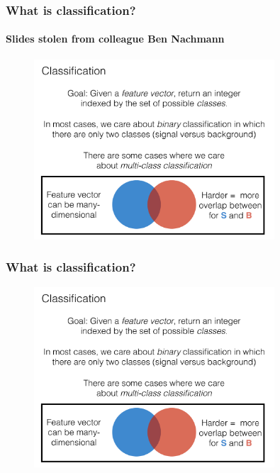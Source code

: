 \documentclass[hyperref={colorlinks=true}]{beamer}
\begin{document}
\begin{frame}%
  \frametitle{What is classification?}
  \framesubtitle{Slides stolen from colleague Ben Nachmann}

  \vspace{-0.3cm}

  \begin{figure}
    \centering 
    \includegraphics[width=0.8\textwidth,page=1]{ClassifierSlides.pdf}
  \end{figure}

    
\end{frame}


\begin{frame}%
  \frametitle{What is classification?}

  \vspace{-0.3cm}

  \begin{figure}
    \centering 
    \includegraphics[width=0.8\textwidth,page=2]{ClassifierSlides.pdf}
  \end{figure}

    
\end{frame}
\end{document}
